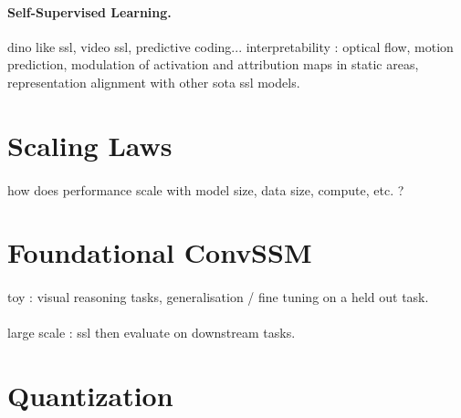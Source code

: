 \documentclass{article}
\begin{document}
\paragraph{Self-Supervised Learning.}dino like ssl, video ssl, predictive coding... interpretability : optical flow, motion prediction, modulation of activation and attribution maps in static areas, representation alignment with other sota ssl models.

\section{Scaling Laws}

\paragraph{}how does performance scale with model size, data size, compute, etc. ?

\section{Foundational ConvSSM}

\paragraph{}toy : visual reasoning tasks, generalisation / fine tuning on a held out task.

\paragraph{}large scale : ssl then evaluate on downstream tasks.

\section{Quantization}

\paragraph{}
\end{document}
